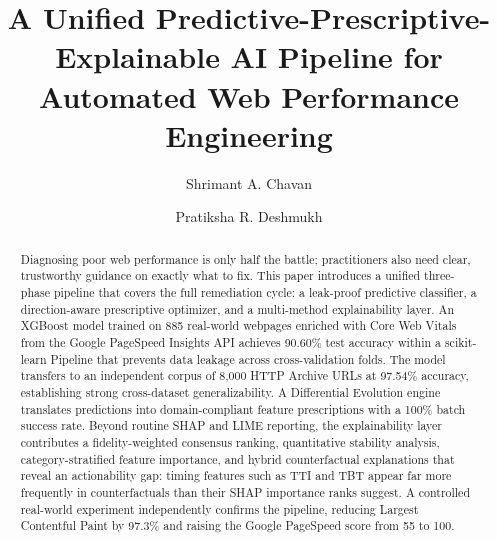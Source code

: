 \documentclass{svproc}
\begin{document}
\mainmatter

\title{A Unified Predictive-Prescriptive-Explainable AI Pipeline for Automated Web Performance Engineering}


\author{Shrimant A. Chavan \and Pratiksha R. Deshmukh}
%
%
%

\maketitle

\begin{abstract}
Diagnosing poor web performance is only half the battle; practitioners also need clear, trustworthy guidance on exactly what to fix. This paper introduces a unified three-phase pipeline that covers the full remediation cycle: a leak-proof predictive classifier, a direction-aware prescriptive optimizer, and a multi-method explainability layer. An XGBoost model trained on 885 real-world webpages enriched with Core Web Vitals from the Google PageSpeed Insights API achieves 90.60\% test accuracy within a scikit-learn Pipeline that prevents data leakage across cross-validation folds. The model transfers to an independent corpus of 8,000 HTTP Archive URLs at 97.54\% accuracy, establishing strong cross-dataset generalizability. A Differential Evolution engine translates predictions into domain-compliant feature prescriptions with a 100\% batch success rate. Beyond routine SHAP and LIME reporting, the explainability layer contributes a fidelity-weighted consensus ranking, quantitative stability analysis, category-stratified feature importance, and hybrid counterfactual explanations that reveal an actionability gap: timing features such as TTI and TBT appear far more frequently in counterfactuals than their SHAP importance ranks suggest. A controlled real-world experiment independently confirms the pipeline, reducing Largest Contentful Paint by 97.3\% and raising the Google PageSpeed score from 55 to 100.
\end{abstract}
\end{document}
